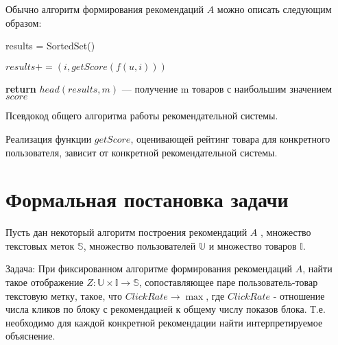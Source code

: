 \documentclass[12pt,a4paper]{report}
\begin{document}
Обычно алгоритм формирования рекомендаций $A$ можно описать следующим образом:


\begin{algorithm}[H]
\SetAlgoLined
{}

results = SortedSet()

 {
	
	$results += (i, getScore(f(u, i)))$
	
}

\textbf{return} $head(results, m)$ --- получение m товаров с наибольшим значением $score$

\caption{Псевдокод общего алгоритма работы рекомендательной системы.}
\label{alg:GENERALRS}
\end{algorithm}

Реализация функции $getScore$, оценивающей рейтинг товара для конкретного пользователя, зависит от конкретной рекомендательной системы.

\section{Формальная постановка задачи}
Пусть дан некоторый алгоритм построения рекомендаций $A$ ,  множество текстовых меток $\mathbb{S}$, множество пользователей $\mathbb{U}$ и множество товаров $\mathbb{I}$.

Задача: При фиксированном алгоритме формирования рекомендаций $A$,
 найти такое отображение $Z: \mathbb{U} \times \mathbb{I} \to \mathbb{S}$, сопоставляющее паре пользователь-товар  текстовую метку, такое, что  $ClickRate \to \max$, где $ClickRate$ - отношение числа кликов по блоку с рекомендацией к общему числу показов блока. Т.е. необходимо для каждой конкретной рекомендации найти 
 интерпретируемое объяснение. 
\end{document}
